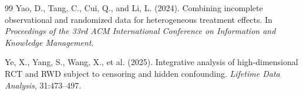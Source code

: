 \documentclass[11pt]{article}
\begin{document}
\begin{thebibliography}{99}
Yao, D., Tang, C., Cui, Q., and Li, L. (2024).
\newblock Combining incomplete observational and randomized data for
heterogeneous treatment effects.
\newblock In \emph{Proceedings of the 33rd ACM International Conference
on Information and Knowledge Management}.

Ye, X., Yang, S., Wang, X., et al. (2025).
\newblock Integrative analysis of high-dimensional RCT and RWD subject to
censoring and hidden confounding.
\newblock \emph{Lifetime Data Analysis}, 31:473--497.

\end{thebibliography}
\end{document}
